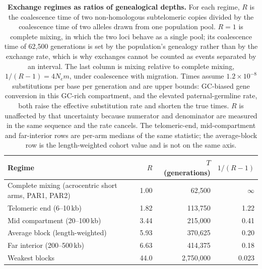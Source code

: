 \documentclass[pdflatex,mathphys]{jnl}
\begin{document}
\begin{table}[h!]
\centering
\caption{\textbf{Exchange regimes as ratios of genealogical depths.} For each regime, $R$ is the
coalescence time of two non-homologous subtelomeric copies divided by the coalescence time of two
alleles drawn from one population pool. $R=1$ is complete mixing, in which the two loci behave as a
single pool; its coalescence time of 62,500 generations is set by the population's genealogy rather than
by the exchange rate, which is why exchanges cannot be counted as events separated by an interval. The
last column is mixing relative to complete mixing,
$1/(R-1)=4N_e m$, under coalescence with migration. Times assume $1.2\times10^{-8}$ substitutions per
base per generation and are upper bounds: GC-biased gene conversion in this GC-rich compartment, and the
elevated paternal-germline rate, both raise the effective substitution rate and shorten the true times.
$R$ is unaffected by that uncertainty because numerator and denominator are measured in the same
sequence and the rate cancels. The telomeric-end, mid-compartment and far-interior rows are per-arm
medians of the same statistic; the average-block row is the length-weighted cohort value and is not on
the same axis.}
\label{tab:exchange_regimes}
\small
\begin{tabular}{lrrr}
\hline
Regime & $R$ & $T$ (generations) & $1/(R-1)$ \\
\hline
Complete mixing (acrocentric short arms, PAR1, PAR2) & 1.00 & 62,500 & $\infty$ \\
Telomeric end (6--10\,kb)           & 1.82 & 113,750 & 1.22 \\
Mid compartment (20--100\,kb)        & 3.44 & 215,000 & 0.41 \\
Average block (length-weighted)     & 5.93 & 370,625 & 0.20 \\
Far interior (200--500\,kb)          & 6.63 & 414,375 & 0.18 \\
Weakest blocks                      & 44.0 & 2,750,000 & 0.023 \\
\hline
\end{tabular}
\end{table}

\clearpage
\end{document}

